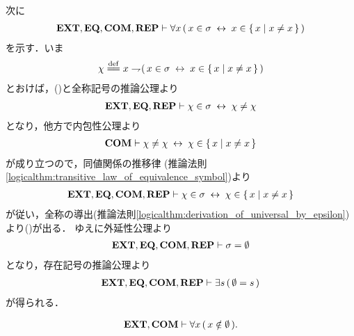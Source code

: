 \begin{sketch}
		次に
		\begin{align}
			\mbox{{\bf EXT}},\mbox{{\bf EQ}},\mbox{\bf COM},\mbox{{\bf REP}} \vdash
			\forall x\, (\, x \in \sigma \hspace{0.25em}\leftrightarrow\hspace{0.25em} x \in \{\, x \mid x \neq x\, \}\, )
			\label{fom:thm_emptyset_is_a_set_5}
		\end{align}
		を示す．いま
		\begin{align}
			\chi \defeq x \negation (\, x \in \sigma \lrarrow x \in \Set{x}{x \neq x}\, )
		\end{align}
		とおけば，()と全称記号の推論公理より
		\begin{align}
			\mbox{{\bf EXT}},\mbox{{\bf EQ}},\mbox{{\bf REP}} \vdash \chi \in \sigma \hspace{0.25em}\leftrightarrow\hspace{0.25em} \chi \neq \chi
		\end{align}
		となり，他方で内包性公理より
		\begin{align}
			\mbox{\bf COM} \vdash \chi \neq \chi \hspace{0.25em}\leftrightarrow\hspace{0.25em} \chi \in \{\, x \mid x \neq x\, \}
		\end{align}
		が成り立つので，同値関係の推移律
		(推論法則\ref{logicalthm:transitive_law_of_equivalence_symbol})より
		\begin{align}
			\mbox{{\bf EXT}},\mbox{{\bf EQ}},\mbox{\bf COM},\mbox{{\bf REP}} \vdash
			\chi \in \sigma \hspace{0.25em}\leftrightarrow\hspace{0.25em} \chi \in \{\, x \mid x \neq x\, \}
		\end{align}
		が従い，全称の導出(推論法則\ref{logicalthm:derivation_of_universal_by_epsilon})より()が出る．
		ゆえに外延性公理より
		\begin{align}
			\mbox{{\bf EXT}},\mbox{{\bf EQ}},\mbox{\bf COM},\mbox{{\bf REP}} \vdash \sigma = \emptyset
		\end{align}
		となり，存在記号の推論公理より
		\begin{align}
			\mbox{{\bf EXT}},\mbox{{\bf EQ}},\mbox{\bf COM},\mbox{{\bf REP}} \vdash \exists s\, (\, \emptyset = s\, )
		\end{align}
		が得られる．
		\QED
	\end{sketch}
	
	\begin{screen}
		\begin{thm}[空集合はいかなる集合も持たない]\label{thm:emptyset_has_nothing}
			\begin{align}
				\mbox{{\bf EXT}},\mbox{\bf COM} \vdash \forall x\, (\, x \notin \emptyset\, ).
			\end{align}
		\end{thm}
	\end{screen}
	

